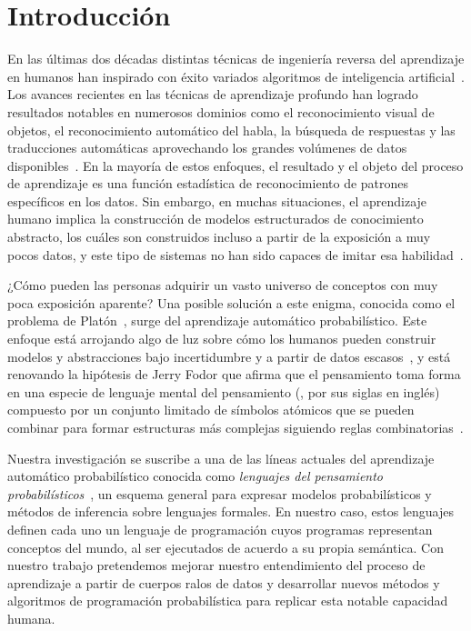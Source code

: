 
\chapter{Introducción}
\label{intro}

En las últimas dos décadas distintas técnicas de ingeniería reversa del aprendizaje en humanos han inspirado con éxito variados algoritmos de inteligencia artificial~\cite{russell2002artificial}. Los avances recientes en las técnicas de aprendizaje profundo han logrado resultados notables en numerosos dominios como el reconocimiento visual de objetos, el reconocimiento automático del habla, la búsqueda de respuestas y las traducciones automáticas aprovechando los grandes volúmenes de datos disponibles~\cite{lecun2015deep}. En la mayoría de estos enfoques, el resultado y el objeto del proceso de aprendizaje es una función estadística de reconocimiento de patrones específicos en los datos. Sin embargo, en muchas situaciones, el aprendizaje humano implica la construcción de modelos estructurados de conocimiento abstracto, los cuáles son construidos incluso a partir de la exposición a muy pocos datos, y este tipo de sistemas no han sido capaces de imitar esa habilidad~\cite{lake2017building}.

¿Cómo pueden las personas adquirir un vasto universo de conceptos con muy poca exposición aparente? Una posible solución a este enigma, conocida como el problema de Platón~\cite{chomsky1986knowledge, chomsky2006cognitive}, surge del aprendizaje automático probabilístico. Este enfoque está arrojando algo de luz sobre cómo los humanos pueden construir modelos y abstracciones bajo incertidumbre y a partir de datos escasos~\cite{tenenbaum2011grow,ghahramani2015probabilistic}, y está renovando la hipótesis de Jerry Fodor que afirma que el pensamiento toma forma en una especie de lenguaje mental del pensamiento (\lot, por sus siglas en inglés) compuesto por un conjunto limitado de símbolos atómicos que se pueden combinar para formar estructuras más complejas siguiendo reglas combinatorias~\cite{fodor1975language}.

Nuestra investigación se suscribe a una de las líneas actuales del aprendizaje automático probabilístico conocida como {\em lenguajes del pensamiento probabilísticos}~\cite{goodman2014concepts}, un esquema general para expresar modelos probabilísticos y métodos de inferencia sobre lenguajes formales. En nuestro caso, estos lenguajes definen cada uno un lenguaje de programación cuyos programas representan conceptos  del mundo, al ser ejecutados de acuerdo a su propia semántica. Con nuestro trabajo pretendemos mejorar nuestro entendimiento del proceso de aprendizaje a partir de cuerpos ralos de datos y desarrollar nuevos métodos y algoritmos de programación probabilística para replicar esta notable capacidad humana. 


